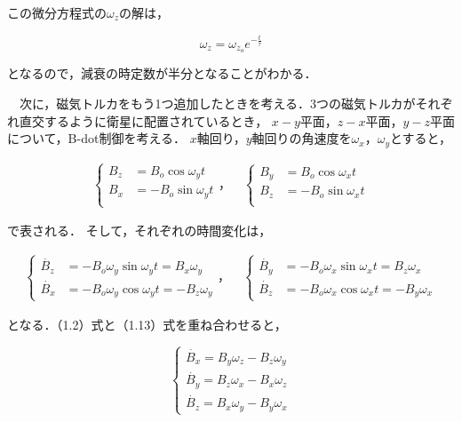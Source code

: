 この微分方程式の$\omega_z$の解は，

\begin{equation}
    \omega_z = \omega_{z_o}e^{-\frac{t}{\tau}} 
\end{equation}

となるので，減衰の時定数が半分となることがわかる．


　次に，磁気トルカをもう1つ追加したときを考える．3つの磁気トルカがそれぞれ直交するように衛星に配置されているとき，
$x-y$平面，$z-x$平面，$y-z$平面について，B-dot制御を考える．
$x$軸回り，$y$軸回りの角速度を$\omega_x$，$\omega_y$とすると，

\begin{align}
    \left\{
        \begin{aligned}
            B_z &= B_o\cos\omega_yt\\
            B_x &= -B_o\sin\omega_yt\\
        \end{aligned}                    
    \right.
    ，\quad
    \left\{
        \begin{aligned}
            B_y &= B_o\cos\omega_xt\\
            B_z &= -B_o\sin\omega_xt\\
        \end{aligned}                    
    \right.
\end{align}

で表される．
そして，それぞれの時間変化は，

\begin{align}
    \left\{
        \begin{aligned}
            \dot{B_z} &= -B_o\omega_y\sin\omega_yt = B_x\omega_y\\
            \dot{B_x} &= -B_o\omega_y\cos\omega_yt = -B_z\omega_y
        \end{aligned}                    
    \right.
    ，\quad
    \left\{
        \begin{aligned}
            \dot{B_y} &= -B_o\omega_x\sin\omega_xt = B_z\omega_x\\
            \dot{B_z} &= -B_o\omega_x\cos\omega_xt = -B_y\omega_x
        \end{aligned}                    
    \right.
\end{align}

となる．（1.2）式と（1.13）式を重ね合わせると，

\begin{equation}
    \left\{
        \begin{aligned}
            \dot{B_x} = B_y\omega_z - B_z\omega_y\\
            \dot{B_y} = B_z\omega_x - B_x\omega_z\\
            \dot{B_z} = B_x\omega_y - B_y\omega_x
        \end{aligned}
    \right.
\end{equation}

